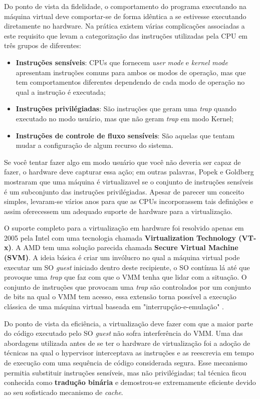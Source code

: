 Do ponto de vista da fidelidade, o comportamento do programa executando na
máquina virtual deve comportar-se de forma idêntica a se estivesse executando
diretamente no hardware. Na prática existem várias complicações associadas a
este requisito que levam a categorização das instruções utilizadas pela CPU em
três grupos de diferentes:

\begin{itemize}
  \item \textbf{Instruções sensíveis}: CPUs que fornecem \emph{user mode} e
        \emph{kernel mode} apresentam instruções comuns para ambos os modos de
        operação, mas que tem comportamentos diferentes dependendo de cada modo
        de operação no qual a instrução é executada;
  \item \textbf{Instruções privilégiadas}: São instruções que geram uma
        \emph{trap} quando executado no modo usuário, mas que não geram
        \emph{trap} em modo Kernel;
  \item \textbf{Instruções de controle de fluxo sensíveis}: São aquelas que
        tentam mudar a configuração de algum recurso do sistema.
\end{itemize}

Se você tentar fazer algo em modo usuário que você não deveria ser capaz de
fazer, o hardware deve capturar essa ação; em outras palavras, Popek e Goldberg
mostraram que uma máquina é virtualizavel se o conjunto de instruções sensíveis
é um subconjunto das instruções privilégiadas. Apesar de parecer um conceito
simples, levaram-se vários anos para que as CPUs incorporassem tais definições
e assim oferecessem um adequado suporte de hardware para a virtualização.

O suporte completo para a virtualização em hardware foi resolvido apenas em
2005 pela Intel \cite{uhlig} com uma tecnologia chamada \textbf{Virtualization
Technology (VT-x)}. A AMD tem uma solução parecida chamada \textbf{Secure
Virtual Machine (SVM)}. A ideia básica é criar um invólucro no qual a máquina
virtual pode executar um SO \emph{guest} iniciado dentro deste recipiente, o SO
contínua lá até que provoque uma \emph{trap} que faz com que o VMM tenha que
lidar com a situação. O conjunto de instruções que provocam uma \emph{trap} são
controlados por um conjunto de bits na qual o VMM tem acesso, essa extensão
torna possível a execução clássica de uma máquina virtual baseada em
"interrupção-e-emulação" \cite{tanenbaum}.

Do ponto de vista da eficiência, a virtualização deve fazer com que a maior
parte do código executado pelo SO \emph{guest} não sofra interferência do VMM.
Uma das abordagens utilizada antes de se ter o hardware de virtualização foi a
adoção de técnicas na qual o hypervisor interceptava as instruções e as
reescrevia em tempo de execução com uma sequência de código considerada segura.
Esse mecanismo permitia substituir instruções sensíveis, mas não privilégiadas;
tal técnica ficou conhecida como \textbf{tradução binária} e demostrou-se
extremamente eficiente devido ao seu sofisticado mecanismo de \emph{cache}.

